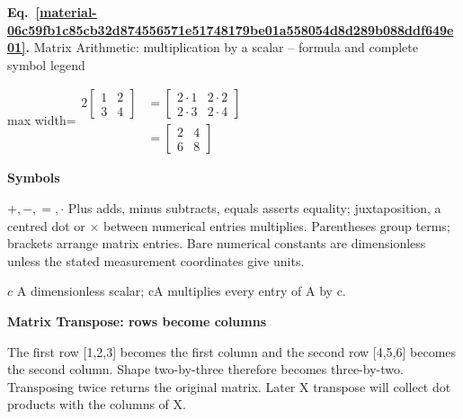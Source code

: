 \documentclass[11pt,a4paper]{article}
\begin{document}
\par\medskip
\noindent\begin{minipage}{\linewidth}
\label{material-06c59fb1c85cb32d874556571e51748179be01a558054d8d289b088ddf649e01}
\noindent\textbf{Eq.~\ref*{material-06c59fb1c85cb32d874556571e51748179be01a558054d8d289b088ddf649e01}.} Matrix Arithmetic: multiplication by a scalar – formula and complete symbol legend\par\nopagebreak
\begin{center}\begin{adjustbox}{max width=\linewidth}$\displaystyle \begin{aligned}2\begin{bmatrix}1&2\\3&4\end{bmatrix}&=\begin{bmatrix}\boxed{2\cdot1}&2\cdot2\\2\cdot3&2\cdot4\end{bmatrix}\\&=\begin{bmatrix}2&4\\6&8\end{bmatrix}\end{aligned}$\end{adjustbox}\end{center}

\par\noindent\textbf{Symbols}

\par\noindent\textbf{\(+,-,=,\cdot\)} Plus adds, minus subtracts, equals asserts equality; juxtaposition, a centred dot or \ensuremath{\times} between numerical entries multiplies. Parentheses group terms; brackets arrange matrix entries. Bare numerical constants are dimensionless unless the stated measurement coordinates give units.

\par\noindent\textbf{\(c\)} A dimensionless scalar; cA multiplies every entry of A by c.

\end{minipage}\par
\medskip

\textbf{Matrix Transpose: rows become columns}


The first row [1,2,3] becomes the first column and the second row [4,5,6] becomes the second column. Shape two-by-three therefore becomes three-by-two. Transposing twice returns the original matrix. Later X transpose will collect dot products with the columns of X.
\end{document}
